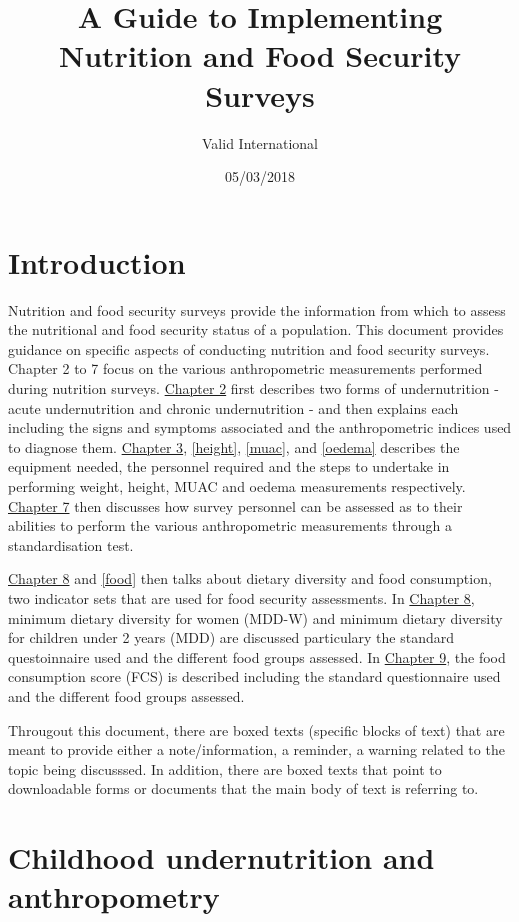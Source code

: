 \documentclass[12pt,]{book}
\title{A Guide to Implementing Nutrition and Food Security Surveys}
\author{Valid International}
\date{05/03/2018}
\theoremstyle{definition}
\theoremstyle{definition}
\theoremstyle{definition}
\theoremstyle{remark}
\begin{document}
\maketitle

{
\setcounter{tocdepth}{1}
\tableofcontents
}
\hypertarget{introduction}{%
\chapter{Introduction}\label{introduction}}

Nutrition and food security surveys provide the information from which
to assess the nutritional and food security status of a population. This
document provides guidance on specific aspects of conducting nutrition
and food security surveys. Chapter 2 to 7 focus on the various
anthropometric measurements performed during nutrition surveys.
\protect\hyperlink{anthro}{Chapter 2} first describes two forms of
undernutrition - acute undernutrition and chronic undernutrition - and
then explains each including the signs and symptoms associated and the
anthropometric indices used to diagnose them.
\protect\hyperlink{weight}{Chapter 3}, \ref{height}, \ref{muac}, and
\ref{oedema} describes the equipment needed, the personnel required and
the steps to undertake in performing weight, height, MUAC and oedema
measurements respectively. \protect\hyperlink{standard}{Chapter 7} then
discusses how survey personnel can be assessed as to their abilities to
perform the various anthropometric measurements through a
standardisation test.

\protect\hyperlink{diet}{Chapter 8} and \ref{food} then talks about
dietary diversity and food consumption, two indicator sets that are used
for food security assessments. In \protect\hyperlink{diet}{Chapter 8},
minimum dietary diversity for women (MDD-W) and minimum dietary
diversity for children under 2 years (MDD) are discussed particulary the
standard questoinnaire used and the different food groups assessed. In
\protect\hyperlink{food}{Chapter 9}, the food consumption score (FCS) is
described including the standard questionnaire used and the different
food groups assessed.

Througout this document, there are boxed texts (specific blocks of text)
that are meant to provide either a note/information, a reminder, a
warning related to the topic being discusssed. In addition, there are
boxed texts that point to downloadable forms or documents that the main
body of text is referring to.

\hypertarget{anthro}{%
\chapter{Childhood undernutrition and anthropometry}\label{anthro}}
\end{document}
